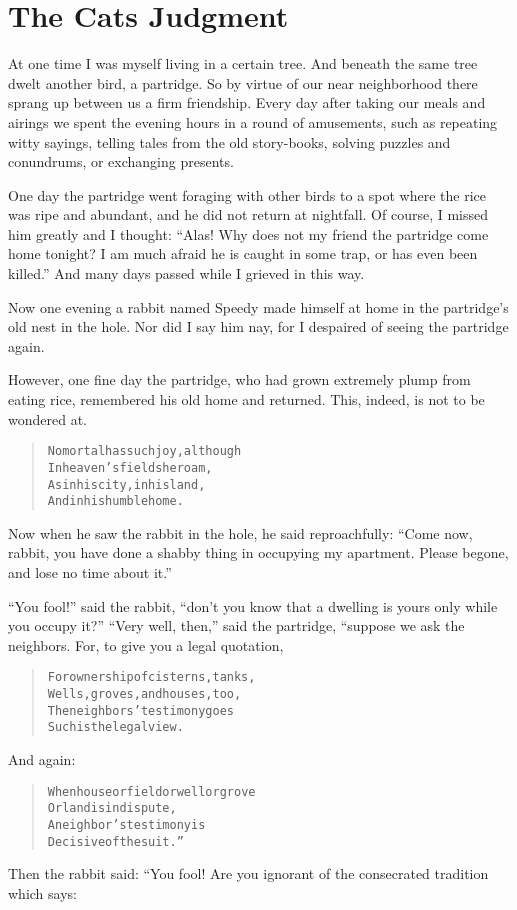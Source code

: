 \documentclass[article, twoside, 14pt]{memoir}
\renewenvironment{verbatim}{%
\begin{quote}%
\vskip -10pt%
\begin{alltt}\normalfont\large}{\end{alltt}%
\end{quote}%
\vskip -10pt
} %
\begin{document}
\chapter{The Cats Judgment}

\label{s50}

At one time I was myself living in a certain tree. And
beneath the same tree dwelt another bird, a partridge. So by virtue
of our near neighborhood there sprang up between us a firm
friendship. Every day after taking our meals and airings we spent
the evening hours in a round of amusements, such as repeating witty
sayings, telling tales from the old story-books, solving puzzles
and conundrums, or exchanging presents.

One day the partridge went foraging with other birds to a spot
where the rice was ripe and abundant, and he did not return at
nightfall. Of course, I missed him greatly and I thought:
``Alas! Why does not my friend the partridge come home tonight? I am much afraid he is caught in some trap, or has even been killed.''
And many days passed while I grieved in this way.

Now one evening a rabbit named Speedy made himself at home in the
partridge's old nest in the hole. Nor did I say him nay, for I
despaired of seeing the partridge again.

However, one fine day the partridge, who had grown extremely plump
from eating rice, remembered his old home and returned. This,
indeed, is not to be wondered at.

\begin{verbatim}
No mortal has such joy, although
    In heaven's fields he roam,
As in his city, in his land,
    And in his humble home.
\end{verbatim}
Now when he saw the rabbit in the hole, he said reproachfully:
``Come now, rabbit, you have done a shabby thing in occupying my apartment. Please begone, and lose no time about it.''

``You fool!'' said the rabbit,
``don't you know that a dwelling is yours only while you occupy it?''
``Very well, then,'' said the partridge, “suppose we ask the
neighbors. For, to give you a legal quotation,

\begin{verbatim}
For ownership of cisterns, tanks,
    Wells, groves, and houses, too,
The neighbors' testimony goes{\textemdash}
    Such is the legal view.
\end{verbatim}
And again:

\begin{verbatim}
When house or field or well or grove
    Or land is in dispute,
A neighbor's testimony is
    Decisive of the suit.”
\end{verbatim}
Then the rabbit said: “You fool! Are you ignorant of the
consecrated tradition which says:
\end{document}
